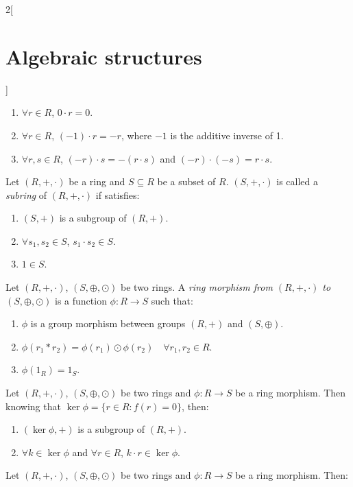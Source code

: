 \documentclass[../../../main.tex]{subfiles}
\begin{document}
\begin{multicols}{2}[\section{Algebraic structures}]
\begin{lemma}
\begin{enumerate}
        \item $\forall r\in R$, $0\cdot r=0$.
        \item $\forall r\in R$, $(-1)\cdot r=-r$, where $-1$ is the additive inverse of 1.
        \item $\forall r,s\in R$, $(-r)\cdot s=-(r\cdot s)$ and $(-r)\cdot (-s)=r\cdot s$.
    \end{enumerate}
\end{lemma}
\begin{definition}[Subring]
    Let $(R,+,\cdot)$ be a ring and $S\subseteq R$ be a subset of $R$. $(S,+,\cdot)$ is called a \textit{subring} of $(R,+,\cdot)$ if satisfies:
    \begin{enumerate}
        \item $(S,+)$ is a subgroup of $(R,+)$.
        \item $\forall s_1,s_2\in S$, $s_1\cdot s_2\in S$.
        \item $1\in S$.
    \end{enumerate}
\end{definition}
\begin{definition}
    Let $(R,+,\cdot)$, $(S,\oplus,\odot)$ be two rings. A \textit{ring morphism from $(R,+,\cdot)$ to $(S,\oplus,\odot)$} is a function $\phi:R\rightarrow S$ such that:
    \begin{enumerate}
        \item $\phi$ is a group morphism between groups $(R,+)$ and $(S,\oplus)$.
        \item $\phi(r_1*r_2)=\phi(r_1)\odot\phi(r_2)\quad\forall r_1,r_2\in R$.
        \item $\phi(1_R)=1_S$.
    \end{enumerate}
\end{definition}
\begin{lemma}
    Let $(R,+,\cdot)$, $(S,\oplus,\odot)$ be two rings and $\phi:R\rightarrow S$ be a ring morphism. Then knowing that $\ker\phi=\{r\in R:f(r)=0\}$, then:
    \begin{enumerate}
        \item $(\ker\phi,+)$ is a subgroup of $(R,+)$.
        \item $\forall k\in\ker\phi$ and $\forall r\in R$, $k\cdot r\in\ker\phi$.
    \end{enumerate}
\end{lemma}
\begin{prop}
    Let $(R,+,\cdot)$, $(S,\oplus,\odot)$ be two rings and $\phi:R\rightarrow S$ be a ring morphism. Then:
    \begin{enumerate}

\end{enumerate}
\end{prop}
\end{multicols}
\end{document}
